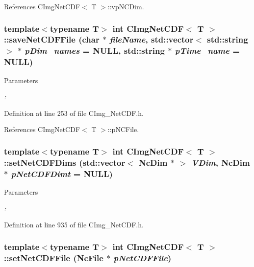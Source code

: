 References CImgNetCDF$<$ T $>$::vpNCDim.\hypertarget{classCImgNetCDF_a94e05ac95caf702c89b9d9344836d425}{
\subsubsection[{saveNetCDFFile}]{\setlength{\rightskip}{0pt plus 5cm}template$<$typename T$>$ int {\bf CImgNetCDF}$<$ T $>$::saveNetCDFFile (char $\ast$ {\em fileName}, \/  std::vector$<$ std::string $>$ $\ast$ {\em pDim\_\-names} = {\ttfamily NULL}, \/  std::string $\ast$ {\em pTime\_\-name} = {\ttfamily NULL})}}
\label{classCImgNetCDF_a94e05ac95caf702c89b9d9344836d425}

\begin{DoxyParams}{Parameters}
\item[{\em :}]\end{DoxyParams}

\begin{DoxyCode}
\end{DoxyCode}
 

Definition at line 253 of file CImg\_\-NetCDF.h.

References CImgNetCDF$<$ T $>$::pNCFile.\hypertarget{classCImgNetCDF_a4d60272a959fcdae94b83f46cf5a2864}{
\subsubsection[{setNetCDFDims}]{\setlength{\rightskip}{0pt plus 5cm}template$<$typename T$>$ int {\bf CImgNetCDF}$<$ T $>$::setNetCDFDims (std::vector$<$ NcDim $\ast$ $>$ {\em VDim}, \/  NcDim $\ast$ {\em pNetCDFDimt} = {\ttfamily NULL})}}
\label{classCImgNetCDF_a4d60272a959fcdae94b83f46cf5a2864}

\begin{DoxyParams}{Parameters}
\item[{\em :}]\end{DoxyParams}

\begin{DoxyCode}
\end{DoxyCode}
 

Definition at line 935 of file CImg\_\-NetCDF.h.\hypertarget{classCImgNetCDF_a8b20f921fe15b013c7b16a21d244bad7}{
\subsubsection[{setNetCDFFile}]{\setlength{\rightskip}{0pt plus 5cm}template$<$typename T$>$ int {\bf CImgNetCDF}$<$ T $>$::setNetCDFFile (NcFile $\ast$ {\em pNetCDFFile})}}
\label{classCImgNetCDF_a8b20f921fe15b013c7b16a21d244bad7}

